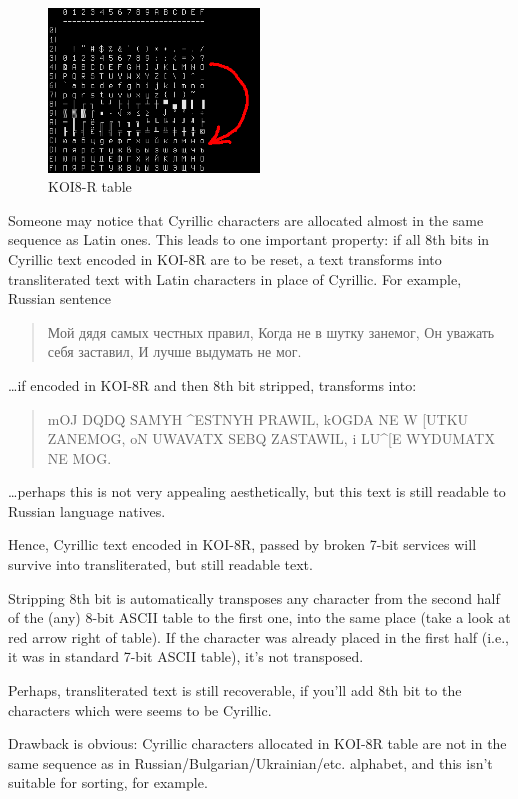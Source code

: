 \begin{figure}[H]
\centering
\includegraphics[width=0.5\textwidth]{fundamentals/koi8r.png}
\caption{KOI8-R table}
\end{figure}

Someone may notice that Cyrillic characters are allocated almost in the same sequence as Latin ones.
This leads to one important property: if all 8th bits in Cyrillic text encoded in KOI-8R are to be reset,
a text transforms into transliterated text with Latin characters in place of Cyrillic.
For example, Russian sentence

\begin{framed}
\begin{quotation}
Мой дядя самых честных правил, Когда не в шутку занемог, Он уважать себя заставил, И лучше выдумать не мог.
\end{quotation}
\end{framed}

\dots if encoded in KOI-8R and then 8th bit stripped, transforms into:

\begin{framed}
\begin{quotation}
mOJ DQDQ SAMYH \^{}ESTNYH PRAWIL, kOGDA NE W [UTKU ZANEMOG, oN UWAVATX SEBQ ZASTAWIL, i LU\^{}[E WYDUMATX NE MOG.
\end{quotation}
\end{framed}

\dots perhaps this is not very appealing aesthetically, but this text is still readable to Russian language natives.

Hence, Cyrillic text encoded in KOI-8R, passed by broken 7-bit services will survive into transliterated, but still
readable text.

Stripping 8th bit is automatically transposes any character from the second half of
the (any) 8-bit \ac{ASCII} table to the first one, into the same place (take a look at red arrow right of table).
If the character was already placed in the first half (i.e., it was in standard 7-bit \ac{ASCII} table), it's not transposed.

Perhaps, transliterated text is still recoverable, if you'll add 8th bit to the characters which were seems to be
Cyrillic.

Drawback is obvious: Cyrillic characters allocated in KOI-8R table are not in the same sequence as
in Russian/Bulgarian/Ukrainian/etc. alphabet, and this isn't suitable for sorting, for example.

